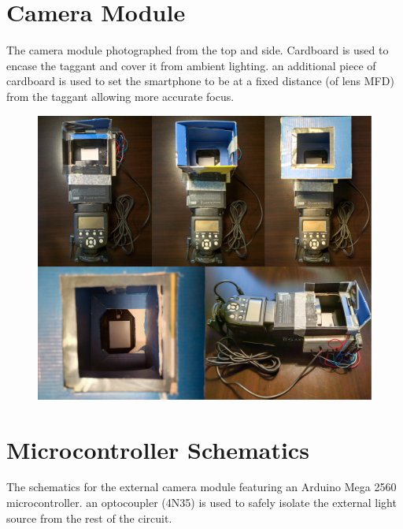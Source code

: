 \documentclass[thesis.tex]{subfiles}
\begin{document}
\chapter{Camera Module}
\label{appendix:camera-module}

The camera module photographed from the top and side. Cardboard is used to encase the taggant and cover it from ambient lighting. an additional piece of cardboard is used to set the smartphone to be at a fixed distance (of lens MFD) from the taggant allowing more accurate focus.

\begin{figure}[h]
\centering \includegraphics[width=\textwidth,height=\textheight,keepaspectratio=true]{images/design_implementation/camera_module-actual.jpg}
\end{figure}




\chapter{Microcontroller Schematics}
\label{appendix:camera-module-schematics}

The schematics for the external camera module featuring an Arduino Mega 2560 microcontroller. an optocoupler (4N35) is used to safely isolate the external light source from the rest of the circuit.
\end{document}
